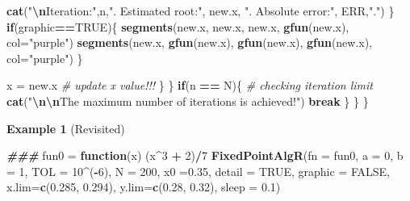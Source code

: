 \documentclass[
]{book}
\newenvironment{Shaded}{\begin{snugshade}}{\end{snugshade}}
\newcommand{\AttributeTok}[1]{\textcolor[rgb]{0.13,0.29,0.53}{#1}}
\newcommand{\CommentTok}[1]{\textcolor[rgb]{0.56,0.35,0.01}{\textit{#1}}}
\newcommand{\ConstantTok}[1]{\textcolor[rgb]{0.56,0.35,0.01}{#1}}
\newcommand{\ControlFlowTok}[1]{\textcolor[rgb]{0.13,0.29,0.53}{\textbf{#1}}}
\newcommand{\DecValTok}[1]{\textcolor[rgb]{0.00,0.00,0.81}{#1}}
\newcommand{\DocumentationTok}[1]{\textcolor[rgb]{0.56,0.35,0.01}{\textbf{\textit{#1}}}}
\newcommand{\FloatTok}[1]{\textcolor[rgb]{0.00,0.00,0.81}{#1}}
\newcommand{\FunctionTok}[1]{\textcolor[rgb]{0.13,0.29,0.53}{\textbf{#1}}}
\newcommand{\NormalTok}[1]{#1}
\newcommand{\OtherTok}[1]{\textcolor[rgb]{0.56,0.35,0.01}{#1}}
\newcommand{\SpecialCharTok}[1]{\textcolor[rgb]{0.81,0.36,0.00}{\textbf{#1}}}
\newcommand{\StringTok}[1]{\textcolor[rgb]{0.31,0.60,0.02}{#1}}
\begin{document}
\begin{Shaded}
\begin{Highlighting}[]
            \FunctionTok{cat}\NormalTok{(}\StringTok{"}\SpecialCharTok{\textbackslash{}n}\StringTok{Iteration:"}\NormalTok{,n,}\StringTok{". Estimated root:"}\NormalTok{, new.x, }\StringTok{". Absolute error:"}\NormalTok{, ERR,}\StringTok{"."}\NormalTok{)}
\NormalTok{         \}}
        \ControlFlowTok{if}\NormalTok{(graphic}\SpecialCharTok{==}\ConstantTok{TRUE}\NormalTok{)\{}
            \FunctionTok{segments}\NormalTok{(new.x, new.x,       new.x,       }\FunctionTok{gfun}\NormalTok{(new.x), }\AttributeTok{col=}\StringTok{"purple"}\NormalTok{)}
            \FunctionTok{segments}\NormalTok{(new.x, }\FunctionTok{gfun}\NormalTok{(new.x), }\FunctionTok{gfun}\NormalTok{(new.x), }\FunctionTok{gfun}\NormalTok{(new.x), }\AttributeTok{col=}\StringTok{"purple"}\NormalTok{)}
\NormalTok{           \}}

\NormalTok{         x }\OtherTok{=}\NormalTok{ new.x         }\CommentTok{\# update x value!!!}
\NormalTok{    \}}
\NormalTok{  \}}
  \ControlFlowTok{if}\NormalTok{(n }\SpecialCharTok{==}\NormalTok{ N)\{              }\CommentTok{\# checking iteration limit}
    \FunctionTok{cat}\NormalTok{(}\StringTok{"}\SpecialCharTok{\textbackslash{}n\textbackslash{}n}\StringTok{The maximum number of iterations is achieved!"}\NormalTok{)   }
    \ControlFlowTok{break}
\NormalTok{  \} }
\NormalTok{ \}}
\NormalTok{\}}
\end{Highlighting}
\end{Shaded}

\hfill\break

\textbf{Example 1} (Revisited)

\begin{Shaded}
\begin{Highlighting}[]
\DocumentationTok{\#\#\#}
\NormalTok{fun0 }\OtherTok{=} \ControlFlowTok{function}\NormalTok{(x) (x}\SpecialCharTok{\^{}}\DecValTok{3} \SpecialCharTok{+} \DecValTok{2}\NormalTok{)}\SpecialCharTok{/}\DecValTok{7}
\FunctionTok{FixedPointAlgR}\NormalTok{(}\AttributeTok{fn =}\NormalTok{ fun0, }\AttributeTok{a =} \DecValTok{0}\NormalTok{, }\AttributeTok{b =} \DecValTok{1}\NormalTok{, }\AttributeTok{TOL =} \DecValTok{10}\SpecialCharTok{\^{}}\NormalTok{(}\SpecialCharTok{{-}}\DecValTok{6}\NormalTok{), }\AttributeTok{N =} \DecValTok{200}\NormalTok{, }
               \AttributeTok{x0 =}\FloatTok{0.35}\NormalTok{, }\AttributeTok{detail =} \ConstantTok{TRUE}\NormalTok{, }\AttributeTok{graphic =} \ConstantTok{FALSE}\NormalTok{, }
               \AttributeTok{x.lim=}\FunctionTok{c}\NormalTok{(}\FloatTok{0.285}\NormalTok{, }\FloatTok{0.294}\NormalTok{), }\AttributeTok{y.lim=}\FunctionTok{c}\NormalTok{(}\FloatTok{0.28}\NormalTok{, }\FloatTok{0.32}\NormalTok{), }\AttributeTok{sleep =} \FloatTok{0.1}\NormalTok{)}
\end{Highlighting}
\end{Shaded}
\end{document}
